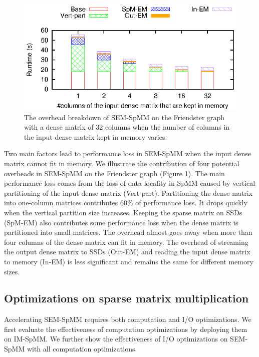\begin{figure}
	\begin{center}
		\footnotesize
		\includegraphics[scale=1]{SpMM_figs/spmm-32cols-overhead.eps}
		\caption{The overhead breakdown of SEM-SpMM on the Friendster
			graph with a dense matrix of 32 columns when the number
		of columns in the input dense matrix kept in memory varies. }
		\label{perf:spmm32_over}
	\end{center}
\end{figure}

Two main factors lead to performance loss in SEM-SpMM when the input dense matrix
cannot fit in memory. We illustrate the contribution of four potential overheads
in SEM-SpMM on the Friendster graph (Figure \ref{perf:spmm32_over}). The main
performance loss comes from the loss of data locality in SpMM caused by
vertical partitioning of the input dense matrix (Vert-part). Partitioning
the dense matrix into one-column matrices contributes 60\% of performance loss.
It drops quickly when the vertical
partition size increases. Keeping the sparse matrix on SSDs (SpM-EM)
also contributes some performance loss when the dense matrix is partitioned
into small matrices. The overhead almost goes away when more than four columns
of the dense matrix can fit in memory. The overhead of streaming the output dense
matrix to SSDs (Out-EM) and reading the input dense matrix to memory (In-EM)
is less significant and remains the same for different memory sizes.

\subsection{Optimizations on sparse matrix multiplication}
Accelerating SEM-SpMM requires both computation and I/O optimizations.
We first evaluate the effectiveness of computation optimizations by deploying
them on IM-SpMM. We further show the effectiveness of I/O optimizations on
SEM-SpMM with all computation optimizations.

